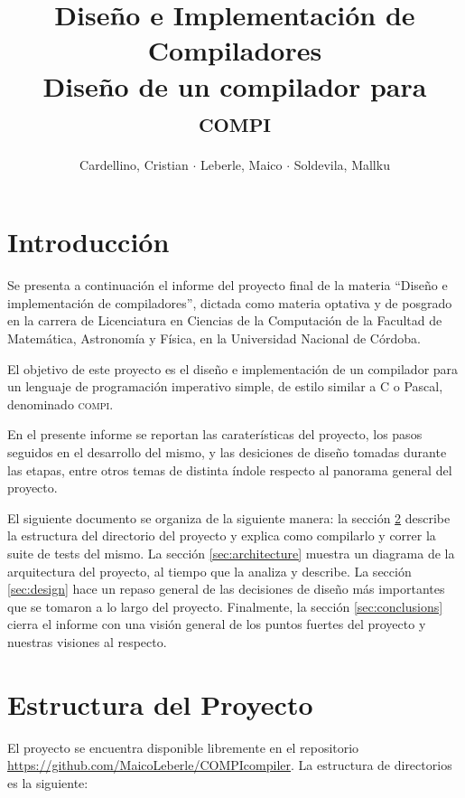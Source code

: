 \documentclass[12pt, a4paper, titlepage]{article}
\title{
  \large{Diseño e Implementación de Compiladores}\\
  \huge{Diseño de un compilador para \textsc{compi}}
}
\author{
  Cardellino, Cristian $\cdot$ Leberle, Maico $\cdot$ Soldevila, Mallku
}
\date{}
\begin{document}
  \maketitle

  \section{Introducción}

  Se presenta a continuación el informe del proyecto final de la materia
  ``Diseño e implementación de compiladores'', dictada como materia optativa y
  de posgrado en la carrera de Licenciatura en Ciencias de la Computación de la
  Facultad de Matemática, Astronomía y Física, en la Universidad Nacional de
  Córdoba.

  El objetivo de este proyecto es el diseño e implementación de un compilador
  para un lenguaje de programación imperativo simple, de estilo similar a C o
  Pascal, denominado \textsc{compi}.

  En el presente informe se reportan las caraterísticas del proyecto, los pasos
  seguidos en el desarrollo del mismo, y las desiciones de diseño tomadas
  durante las etapas, entre otros temas de distinta índole respecto al panorama
  general del proyecto.

  El siguiente documento se organiza de la siguiente manera: la sección
  \ref{sec:struct} describe la estructura del directorio del proyecto y explica
  como compilarlo y correr la suite de tests del mismo. La sección
  \ref{sec:architecture} muestra un diagrama de la arquitectura del proyecto, al
  tiempo que la analiza y describe. La sección \ref{sec:design} hace un repaso
  general de las decisiones de diseño más importantes que se tomaron a lo largo
  del proyecto. Finalmente, la sección \ref{sec:conclusions} cierra el informe
  con una visión general de los puntos fuertes del proyecto y nuestras visiones
  al respecto.

  \section{Estructura del Proyecto}\label{sec:struct}

  El proyecto se encuentra disponible libremente en el repositorio
  \url{https://github.com/MaicoLeberle/COMPIcompiler}. La estructura de
  directorios es la siguiente:

\end{document}

